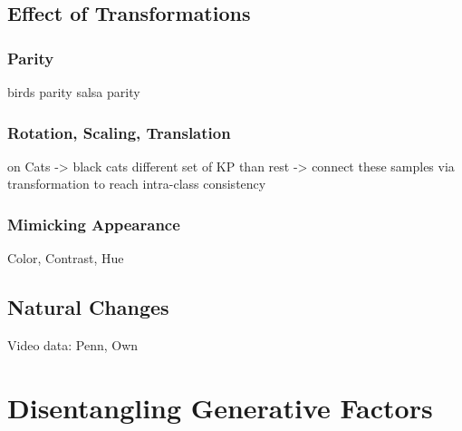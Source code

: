 	\subsection{Effect of Transformations}
		\subsubsection{Parity}
		birds parity
		salsa parity
		\subsubsection{Rotation, Scaling, Translation}
			on Cats -> black cats different set of KP than rest -> connect these samples via transformation to reach intra-class consistency
		\subsubsection{Mimicking Appearance}
		Color, Contrast, Hue
		\subsection{Natural Changes}
		Video data: Penn, Own
\section{Disentangling Generative Factors}
		
